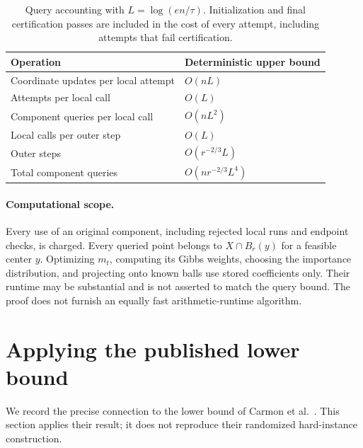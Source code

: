 \documentclass[11pt,a4paper]{article}
\theoremstyle{definition}\newtheorem{definition}[theorem]{Definition}
\theoremstyle{remark}\newtheorem{remark}[theorem]{Remark}
\begin{document}
\begin{table}[t]
\centering
\small
\renewcommand{\arraystretch}{1.2}
\begin{tabular}{@{}ll@{}}
\toprule
Operation & Deterministic upper bound\\
\midrule
Coordinate updates per local attempt & $O(nL)$\\
Attempts per local call & $O(L)$\\
Component queries per local call & $O(nL^2)$\\
Local calls per outer step & $O(L)$\\
Outer steps & $O(r^{-2/3}L)$\\
\midrule
Total component queries & $O(nr^{-2/3}L^4)$\\
\bottomrule
\end{tabular}
\caption{Query accounting with $L=\log(en/\tau)$. Initialization and final
certification passes are included in the cost of every attempt, including
attempts that fail certification.}
\label{tab:accounting}
\end{table}

\paragraph{Computational scope.}
Every use of an original component, including rejected local runs and endpoint checks, is charged. Every queried point belongs to $X\cap B_r(y)$ for a feasible center $y$. Optimizing $m_t$, computing its Gibbs weights, choosing the importance distribution, and projecting onto known balls use stored coefficients only. Their runtime may be substantial and is not asserted to match the query bound. The proof does not furnish an equally fast arithmetic-runtime algorithm.


\section{Applying the published lower bound}\label{sec:lower}
We record the precise connection to the lower bound of
Carmon et al.~\cite{inside}. This section applies their result; it does
not reproduce their randomized hard-instance construction.
\end{document}
